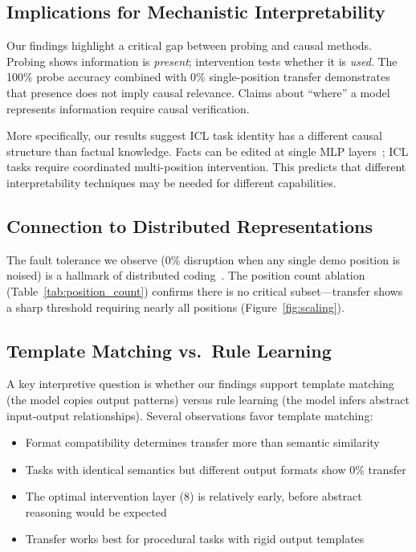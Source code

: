 \documentclass[sigconf,anonymous]{acmart}
\begin{document}
\subsection{Implications for Mechanistic Interpretability}

Our findings highlight a critical gap between probing and causal methods. Probing shows information is \emph{present}; intervention tests whether it is \emph{used}. The 100\% probe accuracy combined with 0\% single-position transfer demonstrates that presence does not imply causal relevance. Claims about ``where'' a model represents information require causal verification.

More specifically, our results suggest ICL task identity has a different causal structure than factual knowledge. Facts can be edited at single MLP layers~\cite{meng2022locating}; ICL tasks require coordinated multi-position intervention. This predicts that different interpretability techniques may be needed for different capabilities.

\subsection{Connection to Distributed Representations}

The fault tolerance we observe (0\% disruption when any single demo position is noised) is a hallmark of distributed coding~\cite{hinton1986distributed}. The position count ablation (Table~\ref{tab:position_count}) confirms there is no critical subset---transfer shows a sharp threshold requiring nearly all positions (Figure~\ref{fig:scaling}).

\subsection{Template Matching vs.\ Rule Learning}

A key interpretive question is whether our findings support template matching (the model copies output patterns) versus rule learning (the model infers abstract input-output relationships). Several observations favor template matching:

\begin{itemize}
    \item Format compatibility determines transfer more than semantic similarity
    \item Tasks with identical semantics but different output formats show 0\% transfer
    \item The optimal intervention layer (8) is relatively early, before abstract reasoning would be expected
    \item Transfer works best for procedural tasks with rigid output templates
\end{itemize}
\end{document}
